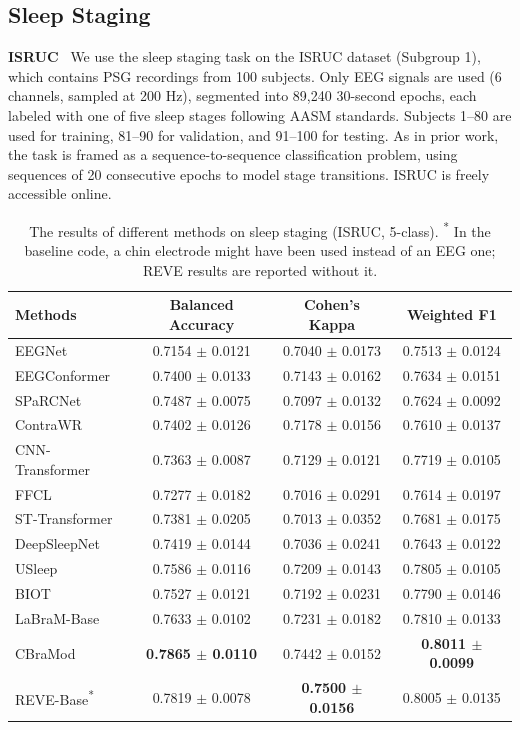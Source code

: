 \documentclass{article}
\begin{document}
\subsection{Sleep Staging}
\label{app:sleep}

\textbf{ISRUC}~\citep{khalighi2016isruc} 
We use the sleep staging task on the ISRUC dataset (Subgroup 1), which contains PSG recordings from 100 subjects. Only EEG signals are used (6 channels, sampled at 200 Hz), segmented into 89,240 30-second epochs, each labeled with one of five sleep stages following AASM standards. Subjects 1–80 are used for training, 81–90 for validation, and 91–100 for testing. As in prior work, the task is framed as a sequence-to-sequence classification problem, using sequences of 20 consecutive epochs to model stage transitions. ISRUC is freely accessible online.

\begin{table}[H]
\caption{The results of different methods on sleep staging (ISRUC, 5-class). \textsuperscript{*} In the baseline code, a chin electrode might have been used instead of an EEG one; REVE results are reported without it.}
\centering
\small
\begin{tabular}{lccc} 
\toprule
\textbf{Methods} & \textbf{Balanced Accuracy} & \textbf{Cohen’s Kappa} & \textbf{Weighted F1} \\
\midrule
EEGNet            & 0.7154 $\pm$ 0.0121 & 0.7040 $\pm$ 0.0173 & 0.7513 $\pm$ 0.0124 \\
EEGConformer      & 0.7400 $\pm$ 0.0133 & 0.7143 $\pm$ 0.0162 & 0.7634 $\pm$ 0.0151 \\
SPaRCNet          & 0.7487 $\pm$ 0.0075 & 0.7097 $\pm$ 0.0132 & 0.7624 $\pm$ 0.0092 \\
ContraWR          & 0.7402 $\pm$ 0.0126 & 0.7178 $\pm$ 0.0156 & 0.7610 $\pm$ 0.0137 \\
CNN-Transformer   & 0.7363 $\pm$ 0.0087 & 0.7129 $\pm$ 0.0121 & 0.7719 $\pm$ 0.0105 \\
FFCL              & 0.7277 $\pm$ 0.0182 & 0.7016 $\pm$ 0.0291 & 0.7614 $\pm$ 0.0197 \\
ST-Transformer    & 0.7381 $\pm$ 0.0205 & 0.7013 $\pm$ 0.0352 & 0.7681 $\pm$ 0.0175 \\
\midrule
DeepSleepNet      & 0.7419 $\pm$ 0.0144 & 0.7036 $\pm$ 0.0241 & 0.7643 $\pm$ 0.0122 \\
USleep            & 0.7586 $\pm$ 0.0116 & 0.7209 $\pm$ 0.0143 & 0.7805 $\pm$ 0.0105 \\
\midrule
BIOT              & 0.7527 $\pm$ 0.0121 & 0.7192 $\pm$ 0.0231 & 0.7790 $\pm$ 0.0146 \\
LaBraM-Base       & 0.7633 $\pm$ 0.0102 & 0.7231 $\pm$ 0.0182 & 0.7810 $\pm$ 0.0133 \\
CBraMod           & \textbf{0.7865 $\pm$ 0.0110} & 0.7442 $\pm$ 0.0152 & \textbf{0.8011 $\pm$ 0.0099} \\
\midrule
REVE-Base\textsuperscript{*}           & 0.7819 $\pm$ 0.0078 & \textbf{0.7500 $\pm$ 0.0156} & 0.8005 $\pm$ 0.0135 \\
\bottomrule
\end{tabular}

\label{tab:Sleep}
\end{table}
\end{document}

